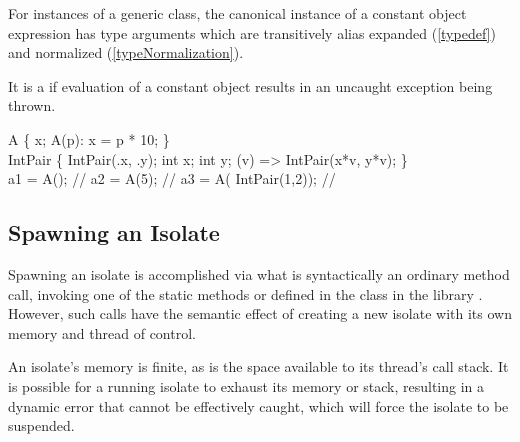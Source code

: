 \documentclass[makeidx]{article}
\begin{document}
{\LMHash{}%
For instances of a generic class,
the canonical instance of a constant object expression has type arguments
which are transitively alias expanded
(\ref{typedef})
and normalized
(\ref{typeNormalization}).

\LMHash{}%
It is a  if evaluation of a constant object
results in an uncaught exception being thrown.


\begin{dartCode}
\CLASS{} A \{
  \FINAL{} x;
  \CONST{} A(p): x = p * 10;
\}
\\
\CLASS{} IntPair \{
  \CONST{} IntPair(\THIS.x, \THIS.y);
  \FINAL{} int x;
  \FINAL{} int y;
  \OPERATOR *(v) => \NEW{} IntPair(x*v, y*v);
\}
\\
\CONST a1 = \CONST{} A(\TRUE); // 
\CONST a2 = \CONST{} A(5); // 
\CONST a3 = \CONST{} A(\CONST{} IntPair(1,2)); // 
\end{dartCode}



\subsection{Spawning an Isolate}

\LMHash{}%
Spawning an isolate is accomplished via what is syntactically
an ordinary method call,
invoking one of the static methods  or  defined in
the  class in the library .
However, such calls have the semantic effect of creating
a new isolate with its own memory and thread of control.

\LMHash{}%
An isolate's memory is finite, as is the space available to
its thread's call stack.
It is possible for a running isolate to exhaust its memory or stack,
resulting in a dynamic error that cannot be effectively caught,
which will force the isolate to be suspended.

}
\end{document}
